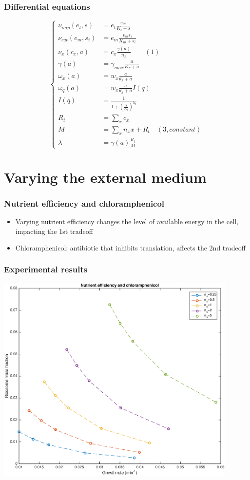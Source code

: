 \documentclass{beamer}
\begin{document}
\begin{frame}
\frametitle{Differential equations}
$$
\begin{cases}
\nu_{imp}(e_t, s) &= e_t\frac{v_t s}{K_t+s} \\
\nu_{cat}(e_m, s_i) &= e_m\frac{v_m s_i}{K_m+s_i} \\
\nu_x (c_x, a) &= c_x \frac{\gamma(a)}{n_x} \qquad (1)\\
\gamma(a) &= \gamma_{max}\frac{a}{K_\gamma+a} \\ 
\omega_x(a) &= w_x\frac{a}{\theta_x+a} \\
\omega_q(a) &= w_x\frac{a}{\theta_x+a}I(q) \\
I(q) &= \frac{1}{1+(\frac{q}{K_q})^{h_q}} \\
R_t &= \sum_x c_x \\
M &= \sum_x n_x x + R_t \quad (3, constant)\\
\lambda &= \gamma(a)\frac{R_t}{M}
\end{cases}
$$
\end{frame}

\section{Varying the external medium}

\begin{frame}
\tableofcontents[currentsection]
\end{frame}

\begin{frame}
\frametitle{Nutrient efficiency and chloramphenicol}
\begin{itemize}
\item Varying nutrient efficiency changes the level of available energy in the cell, impacting the 1st tradeoff
\item Chloramphenicol: antibiotic that inhibits translation, affects the 2nd tradeoff
\end{itemize}
\end{frame}

\begin{frame}
\frametitle{Experimental results}
\centering
\includegraphics[width=0.9\textwidth]{chlor.eps}
\end{frame}
\end{document}
